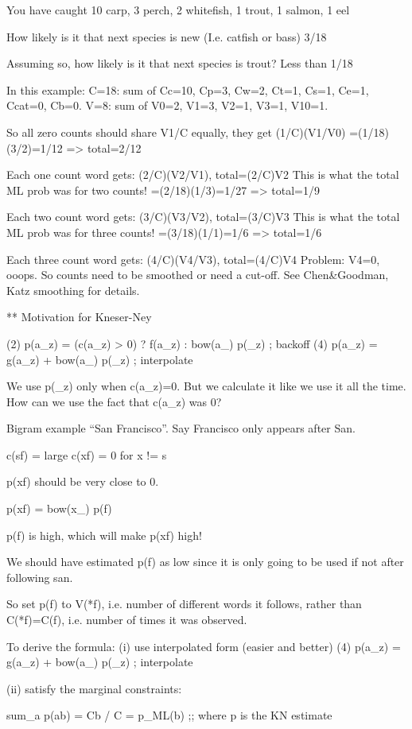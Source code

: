 You have caught 10 carp, 3 perch, 2 whitefish, 1 trout, 1 salmon, 1
eel

How likely is it that next species is new (I.e. catfish or bass) 
3/18

Assuming so, how likely is it that next species is trout?  
Less than 1/18


In this example: 
C=18: sum of Cc=10, Cp=3, Cw=2, Ct=1, Cs=1, Ce=1, Ccat=0, Cb=0.
V=8: sum of V0=2, V1=3, V2=1, V3=1, V10=1.

So all zero counts should share V1/C equally, they get (1/C)(V1/V0)
=(1/18)(3/2)=1/12 => total=2/12

Each one count word gets: (2/C)(V2/V1), total=(2/C)V2
This is what the total ML prob was for two counts!
=(2/18)(1/3)=1/27 => total=1/9

Each two count word gets: (3/C)(V3/V2), total=(3/C)V3
This is what the total ML prob was for three counts!
=(3/18)(1/1)=1/6 => total=1/6

Each three count word gets: (4/C)(V4/V3), total=(4/C)V4
Problem: V4=0, ooops.
So counts need to be smoothed or need a cut-off.  See Chen&Goodman,
Katz smoothing for details.


** Motivation for Kneser-Ney

       (2)  p(a_z) = (c(a_z) > 0) ? f(a_z) : bow(a_) p(_z)   ; backoff
       (4)  p(a_z) = g(a_z) + bow(a_) p(_z)   ; interpolate

We use p(_z) only when c(a_z)=0.  But we calculate it like we use it
all the time.  How can we use the fact that c(a_z) was 0?

Bigram example ``San Francisco''.  Say Francisco only appears after San.

c(sf) = large
c(xf) = 0 for x != s

p(xf) should be very close to 0.

p(xf) = bow(x_) p(f)

p(f) is high, which will make p(xf) high!

We should have estimated p(f) as low since it is only going to be used
if not after following san.

So set p(f) to V(*f), i.e. number of different words it follows,
rather than C(*f)=C(f), i.e. number of times it was observed.

To derive the formula:
(i) use interpolated form (easier and better)
       (4)  p(a_z) = g(a_z) + bow(a_) p(_z)   ; interpolate

(ii) satisfy the marginal constraints:

  sum_a p(ab) = Cb / C = p_ML(b)   ;; where p is the KN estimate

